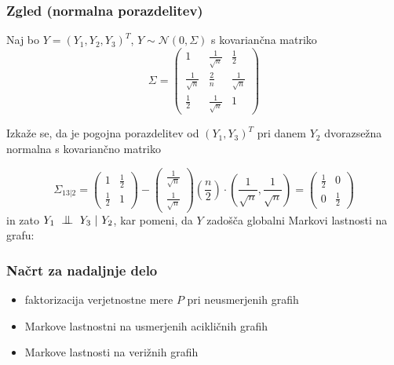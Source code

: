 \documentclass{beamer}
\newcommand{\cond}{\mathrel{\text{\scalebox{1.07}{$\perp\mkern-10mu\perp$}}}}
\begin{document}
\begin{frame}
    \frametitle{Zgled (normalna porazdelitev)}
    Naj bo $Y = (Y_1, Y_2, Y_3)^T$, $Y \sim \mathcal{N} (0,\Sigma)$ s kovariančna matriko
    \begin{equation*}
    \Sigma =
    \begin{pmatrix}
        1 & \frac{1}{\sqrt{n}} & \frac{1}{2}\\
        \frac{1}{\sqrt{n}} & \frac{2}{n} &\frac{1}{\sqrt{n}}\\
        \frac{1}{2} & \frac{1}{\sqrt{n}} & 1
    \end{pmatrix}	
\end{equation*}

Izkaže se, da je pogojna porazdelitev od $(Y_1, Y_3)^T$ pri danem $Y_2$ dvorazsežna normalna
s kovariančno matriko

\begin{equation*}
    \Sigma_{13|2} = 
    \begin{pmatrix}
        1 &  \frac{1}{2}\\
        \frac{1}{2} &  1
    \end{pmatrix}
    -
    \begin{pmatrix}
        \frac{1}{\sqrt{n}}\\
        \frac{1}{\sqrt{n}}
    \end{pmatrix}
    (\frac{n}{2}) \cdot (\frac{1}{\sqrt{n}}, \frac{1}{\sqrt{n}}) = 
    \begin{pmatrix}
        \frac{1}{2} &  0\\
        0 &  \frac{1}{2}
    \end{pmatrix}
\end{equation*}
in zato $Y_1 ~ \cond ~ Y_3 ~|~ Y_2$, kar pomeni, da $Y$ zadošča globalni Markovi lastnosti na grafu:
\begin{center}
    
\end{center}


\end{frame}

\begin{frame}
\frametitle{Načrt za nadaljnje delo}
    \begin{itemize}
        \item faktorizacija verjetnostne mere $P$ pri neusmerjenih grafih
        \item Markove lastnostni na usmerjenih acikličnih grafih
        \item Markove lastnosti na verižnih grafih
    \end{itemize}
\end{frame}
\end{document}
